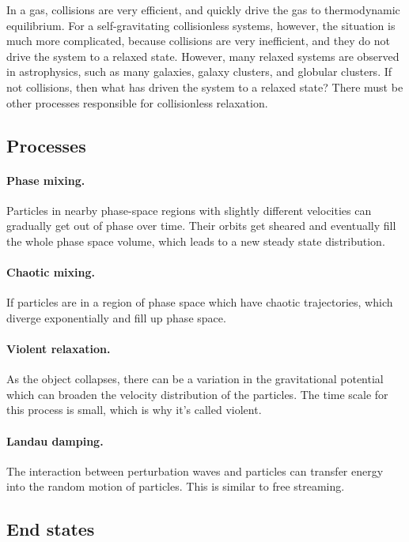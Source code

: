 In a gas, collisions are very efficient, and quickly drive the gas to thermodynamic equilibrium. For a self-gravitating collisionless systems, however, the situation is much more complicated, because collisions are very inefficient, and they do not drive the system to a relaxed state.
However, many relaxed systems are observed in astrophysics, such as many galaxies, galaxy clusters, and globular clusters.
If not collisions, then what has driven the system to a relaxed state?
There must be other processes responsible for collisionless relaxation.

\subsection{Processes}

\paragraph{Phase mixing.}
Particles in nearby phase-space regions with slightly different velocities can gradually get out of phase over time. Their orbits get sheared and eventually fill the whole phase space volume, which leads to a new steady state distribution.

\paragraph{Chaotic mixing.}
If particles are in a region of phase space which have chaotic trajectories, which diverge exponentially and fill up phase space.

\paragraph{Violent relaxation.}
As the object collapses, there can be a variation in the gravitational potential which can broaden the velocity distribution of the particles. The time scale for this process is small, which is why it's called violent.

\paragraph{Landau damping.}
The interaction between perturbation waves and particles can transfer energy into the random motion of particles. This is similar to free streaming.



\subsection{End states}

